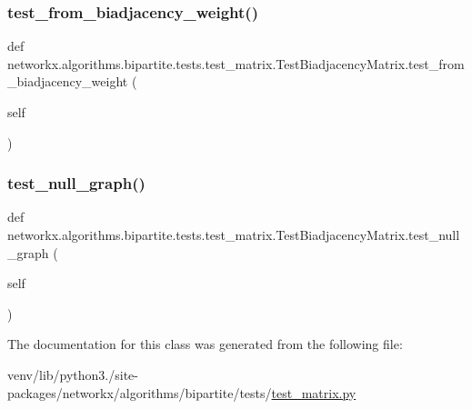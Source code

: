 \subsubsection{\texorpdfstring{test\+\_\+from\+\_\+biadjacency\+\_\+weight()}{test\_from\_biadjacency\_weight()}}
{\footnotesize\ttfamily def networkx.\+algorithms.\+bipartite.\+tests.\+test\+\_\+matrix.\+Test\+Biadjacency\+Matrix.\+test\+\_\+from\+\_\+biadjacency\+\_\+weight (\begin{DoxyParamCaption}\item[{}]{self }\end{DoxyParamCaption})}

\mbox{\label{classnetworkx_1_1algorithms_1_1bipartite_1_1tests_1_1test__matrix_1_1TestBiadjacencyMatrix_a3281f0c95d42450fec9dcce18e4456ff}} 
\subsubsection{\texorpdfstring{test\+\_\+null\+\_\+graph()}{test\_null\_graph()}}
{\footnotesize\ttfamily def networkx.\+algorithms.\+bipartite.\+tests.\+test\+\_\+matrix.\+Test\+Biadjacency\+Matrix.\+test\+\_\+null\+\_\+graph (\begin{DoxyParamCaption}\item[{}]{self }\end{DoxyParamCaption})}



The documentation for this class was generated from the following file\+:\begin{DoxyCompactItemize}
\item 
venv/lib/python3./site-\/packages/networkx/algorithms/bipartite/tests/\hyperlink{test__matrix_8py}{test\+\_\+matrix.\+py}\end{DoxyCompactItemize}
